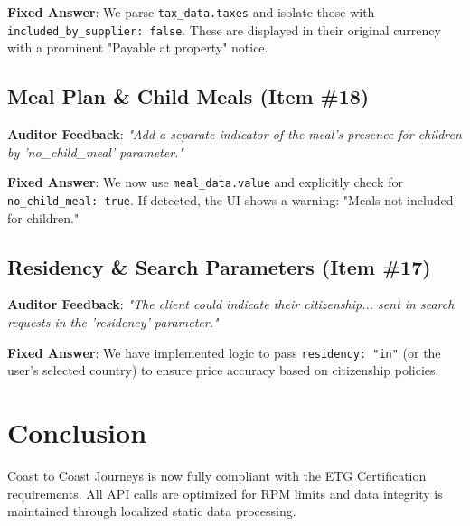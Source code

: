 \documentclass[11pt,a4paper]{article}
\begin{document}
\textbf{Fixed Answer}: We parse \texttt{tax\_data.taxes} and isolate those with \texttt{included\_by\_supplier: false}. These are displayed in their original currency with a prominent "Payable at property" notice.

\subsection{Meal Plan \& Child Meals (Item \#18)}
\textbf{Auditor Feedback}: \textit{"Add a separate indicator of the meal's presence for children by 'no\_child\_meal' parameter."}

\textbf{Fixed Answer}: We now use \texttt{meal\_data.value} and explicitly check for \texttt{no\_child\_meal: true}. If detected, the UI shows a warning: "Meals not included for children."

\subsection{Residency \& Search Parameters (Item \#17)}
\textbf{Auditor Feedback}: \textit{"The client could indicate their citizenship... sent in search requests in the 'residency' parameter."}

\textbf{Fixed Answer}: We have implemented logic to pass \texttt{residency: "in"} (or the user's selected country) to ensure price accuracy based on citizenship policies.

\section{Conclusion}
Coast to Coast Journeys is now fully compliant with the ETG Certification requirements. All API calls are optimized for RPM limits and data integrity is maintained through localized static data processing.
\end{document}
